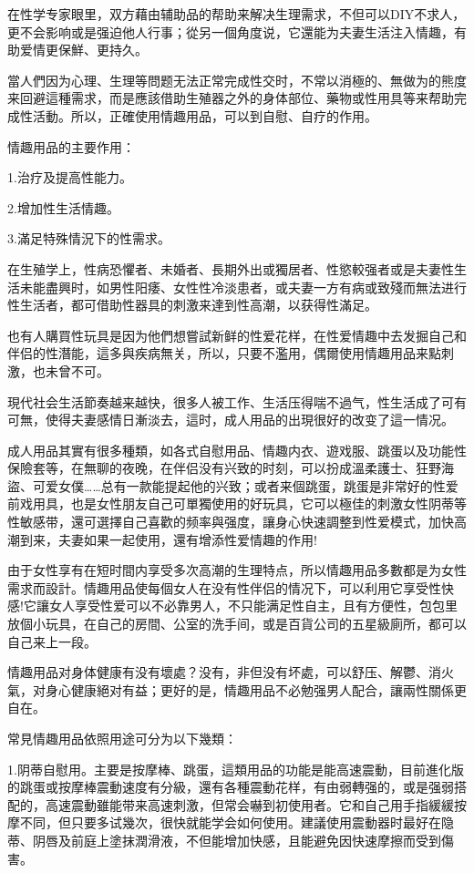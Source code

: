 \documentclass[12pt,UTF8]{ctexbook}
\begin{document}
在性学专家眼里，双方藉由辅助品的帮助来解决生理需求，不但可以DIY不求人，更不会影响或是强迫他人行事；從另一個角度说，它還能为夫妻生活注入情趣，有助爱情更保鮮、更持久。

當人們因为心理、生理等問题无法正常完成性交时，不常以消極的、無做为的熊度来回避這種需求，而是應該借助生殖器之外的身体部位、藥物或性用具等来帮助完成性活動。所以，正確使用情趣用品，可以到自慰、自疗的作用。

情趣用品的主要作用：

1.治疗及提高性能力。

2.增加性生活情趣。

3.滿足特殊情況下的性需求。

在生殖学上，性病恐懼者、未婚者、長期外出或獨居者、性慾較强者或是夫妻性生活未能盡興时，如男性阳痿、女性性冷淡患者，或夫妻一方有病或致殘而無法进行性生活者，都可借助性器具的刺激来達到性高潮，以获得性滿足。

也有人購買性玩具是因为他們想嘗試新鲜的性爱花样，在性爱情趣中去发掘自己和伴侣的性潛能，這多與疾病無关，所以，只要不濫用，偶爾使用情趣用品来點刺激，也未曾不可。

現代社会生活節奏越来越快，很多人被工作、生活压得喘不過气，性生活成了可有可無，使得夫妻感情日漸淡去，這时，成人用品的出現很好的改变了這一情况。

成人用品其實有很多種類，如各式自慰用品、情趣内衣、遊戏服、跳蛋以及功能性保險套等，在無聊的夜晚，在伴侣没有兴致的时刻，可以扮成溫柔護士、狂野海盜、可爱女僕……总有一款能提起他的兴致；或者来個跳蛋，跳蛋是非常好的性爱前戏用具，也是女性朋友自己可單獨使用的好玩具，它可以極佳的刺激女性阴蒂等性敏感带，還可選擇自己喜歡的频率與强度，讓身心快速調整到性爱模式，加快高潮到来，夫妻如果一起使用，還有增添性爱情趣的作用!

由于女性享有在短时間内享受多次高潮的生理特点，所以情趣用品多數都是为女性需求而設計。情趣用品使每個女人在没有性伴侣的情况下，可以利用它享受性快感!它讓女人享受性爱可以不必靠男人，不只能满足性自主，且有方便性，包包里放個小玩具，在自己的房間、公室的洗手间，或是百貨公司的五星級廁所，都可以自己来上一段。

情趣用品对身体健康有没有壞處？没有，非但没有坏處，可以舒压、解鬱、消火氣，对身心健康絕对有益；更好的是，情趣用品不必勉强男人配合，讓兩性關係更自在。

常見情趣用品依照用途可分为以下幾類：

1.阴蒂自慰用。主要是按摩棒、跳蛋，這類用品的功能是能高速震動，目前進化版的跳蛋或按摩棒震動速度有分級，還有各種震動花样，有由弱轉强的，或是强弱搭配的，高速震動雖能带来高速刺激，但常会嚇到初使用者。它和自己用手指緩緩按摩不同，但只要多试幾次，很快就能学会如何使用。建議使用震動器时最好在隐蒂、阴唇及前庭上塗抹潤滑液，不但能增加快感，且能避免因快速摩擦而受到傷害。
\end{document}
